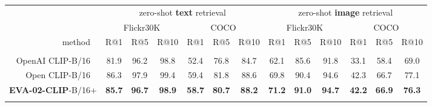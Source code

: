 \documentclass[10pt,twocolumn,letterpaper]{article}
\newcommand{\tablestyle}[2]{\setlength{\tabcolsep}{#1}\renewcommand{\arraystretch}{#2}\centering\footnotesize}
\newcommand{\evablue}[1]{\textcolor{00blue!80}{#1}}
\newcommand{\ph}[1]{\textcolor{white}{#1}}
\newcommand{\phgray}[1]{\textcolor{Graylight!30}{#1}}
\newcommand{\evaTwoclip}{{\textbf{\evablue{EVA-02-CLIP}}}\xspace}
\newcommand{\rgray}{\rowcolor{Graylight!30}}
\begin{document}
\begin{table*}[h]
\vspace{-1.em}
\centering
    \tablestyle{4.2pt}{1.2}
    \begin{tabular}{r|ccc|ccc|ccc|ccc}
        & \multicolumn{6}{c|}{zero-shot \textbf{text} retrieval} & \multicolumn{6}{c}{zero-shot \textbf{image} retrieval} \\
        & \multicolumn{3}{c|}{\scriptsize Flickr30K} & \multicolumn{3}{c|}{\scriptsize COCO} & \multicolumn{3}{c|}{\scriptsize Flickr30K} & \multicolumn{3}{c}{\scriptsize COCO} \\
    
        method{\scriptsize{\ph{+}}} & \scriptsize R@1 & \scriptsize R@5 & \scriptsize R@10 & \scriptsize R@1 & \scriptsize R@5 & \scriptsize R@10 & \scriptsize R@1 & \scriptsize R@5 & \scriptsize R@10 & \scriptsize R@1 & \scriptsize R@5 & \scriptsize R@10 \\
        \shline
        \multicolumn{13}{c}{\scriptsize (a) comparisons with CLIP-\textbf{Base} baselines} \\
        \hline
        \scriptsize OpenAI CLIP-B/16\ph{+} & \scriptsize 81.9 & \scriptsize 96.2 & \scriptsize 98.8 & \scriptsize 52.4 & \scriptsize 76.8 & \scriptsize 84.7 & \scriptsize 62.1 & \scriptsize 85.6 & \scriptsize 91.8 & \scriptsize 33.1 & \scriptsize 58.4 & \scriptsize 69.0 \\
        \scriptsize Open CLIP-B/16\ph{+} & \scriptsize 86.3 & \scriptsize 97.9 & \scriptsize 99.4 & \scriptsize 59.4 & \scriptsize 81.8 & \scriptsize 88.6 & \scriptsize 69.8 & \scriptsize 90.4 & \scriptsize 94.6 & \scriptsize 42.3 & \scriptsize 66.7 & \scriptsize 77.1 \\
        \rgray
        \scriptsize \evaTwoclip-B/16\phgray{+} & \scriptsize \textbf{85.7} & \scriptsize \textbf{96.7} & \scriptsize \textbf{98.9} & \scriptsize \textbf{58.7} & \scriptsize \textbf{80.7} & \scriptsize \textbf{88.2} & \scriptsize \textbf{71.2} & \scriptsize \textbf{91.0} & \scriptsize \textbf{94.7} & \scriptsize \textbf{42.2} & \scriptsize \textbf{66.9} & \scriptsize \textbf{76.3} \\
        \shline
        

\end{tabular}
\end{table*}
\end{document}
